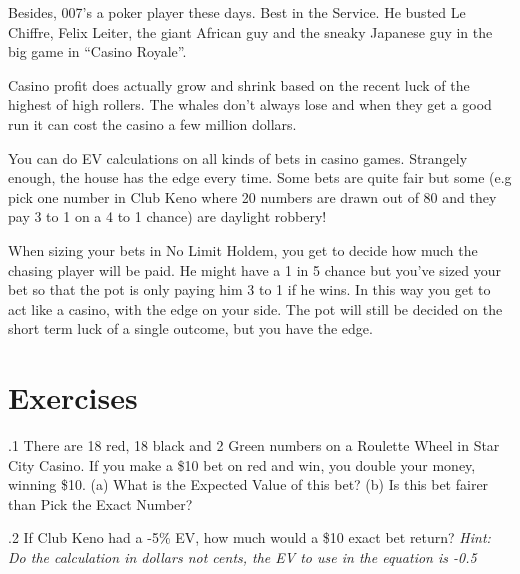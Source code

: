 Besides, 007's a poker player these days. Best in the Service.
He busted Le Chiffre, Felix Leiter, the giant African guy and
the sneaky Japanese guy in the big game in ``Casino Royale''.

Casino profit does actually grow and shrink based on the recent luck
of the highest of high rollers. The whales don't always lose and when
they get a good run it can cost the casino a few million dollars.

You can do EV calculations on all kinds of bets in casino games.
Strangely enough, the house has the edge every time. Some bets
are quite fair but some (e.g pick one number in Club Keno
where 20 numbers are drawn out of 80 and they pay
3 to 1 on a 4 to 1 chance) are daylight robbery!



When sizing your bets in No Limit Holdem, you get to decide how much
the chasing player will be paid. He might have a 1 in 5 chance
but you've sized your bet so that the pot is only paying him 3 to 1
if he wins. In this way you get to act like a casino, with the edge
on your side. The pot will still be decided on the short term luck
of a single outcome, but you have the edge.

\section{Exercises}


.1 There are 18 red, 18 black and 2 Green numbers on
a Roulette Wheel in Star City Casino. If you make a \$10 bet on red
and win, you double your money, winning \$10. (a) What is the Expected
Value of this bet? (b) Is this bet fairer than Pick the Exact Number?

.2 If Club Keno had a -5\% EV, how much would a \$10
exact bet return? \textit{Hint: Do the calculation in dollars not
cents, the EV to use in the equation is -0.5}

